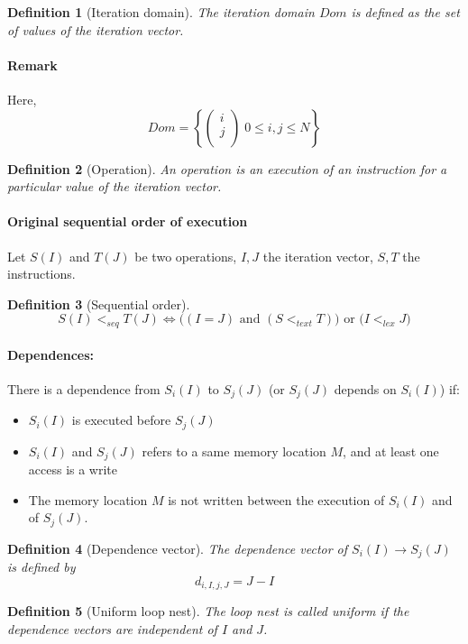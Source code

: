 \documentclass{article}
\newtheorem{defi}{Definition}
\begin{document}
\begin{defi}[Iteration domain]
The iteration domain $Dom$ is defined as the set of values of the iteration vector.
\end{defi}
\paragraph{Remark}
Here,
\[Dom = \left\{ \begin{pmatrix}
i\\
j\\
\end{pmatrix} \; 0\leq i,j\leq N \right\}\]

\begin{defi}[Operation]
An operation is an execution of an instruction for a particular value of the iteration vector.
\end{defi}

\paragraph{Original sequential order of execution}
Let $S(I)$ and $T(J)$ be two operations, $I,J$ the iteration vector, $S,T$ the instructions.

\begin{defi}[Sequential order]
\[S(I)<_{seq}T(J) \Leftrightarrow \Big( (I=J) \text{ and } (S<_{text} T)\Big) \text{ or } \Big( I <_{lex} J \Big)\]
\end{defi}

\paragraph{Dependences:}
There is a dependence from $S_i(I)$ to $S_j(J)$ (or $S_j(J)$ depends on $S_i(I)$) if:
\begin{itemize}
\item $S_i(I)$ is executed before $S_j(J)$
\item $S_i(I)$ and $S_j(J)$ refers to a same memory location $M$, and at least one access is a write
\item The memory location $M$ is not written between the execution of $S_i(I)$ and of $S_j(J)$.
\end{itemize}

\begin{defi}[Dependence vector]
The dependence vector of $S_i(I)\to S_j(J)$ is defined by 
\[d_{i,I,j,J}=J-I\]
\end{defi}

\begin{defi}[Uniform loop nest]
The loop nest is called uniform if the dependence vectors are independent of $I$ and $J$.
\end{defi}
\end{document}
